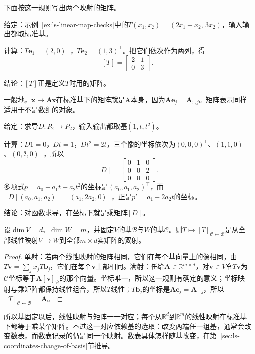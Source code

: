 下面按这一规则写出两个映射的矩阵。
\begin{example}[由基向量的像写出矩阵]
\label{ex:ls-plane-operator-matrix}
给定：示例~\ref{ex:ls-linear-map-checks}中的$T(x_1,x_2)=(2x_1+x_2,\ 3x_2)$，输入输出都取标准基。

计算：$T\bm e_1=(2,0)^{\top}$，$T\bm e_2=(1,3)^{\top}$。把它们依次作为两列，得
\[
 [T]=\begin{bmatrix}2&1\\0&3\end{bmatrix}.
\]

结论：$[T]$正是定义$T$时用的矩阵。
\end{example}
一般地，$\bm x\mapsto\bm A\bm x$在标准基下的矩阵就是$\bm A$本身，因为$\bm A\bm e_j=\bm A_{:,j}$。矩阵表示同样适用于不是数组的对象。
\begin{example}[求导的矩阵表示]
\label{ex:ls-derivative-matrix}
给定：求导$D:P_2\to P_2$，输入输出都取基$(1,t,t^2)$。

计算：$D1=0$，$Dt=1$，$Dt^2=2t$，三个像的坐标依次为$(0,0,0)^\top$、$(1,0,0)^\top$、$(0,2,0)^\top$，所以
\[
 [D]=\begin{bmatrix}0&1&0\\0&0&2\\0&0&0\end{bmatrix}.
\]
多项式$p=a_0+a_1t+a_2t^2$的坐标是$(a_0,a_1,a_2)^\top$，而$[D](a_0,a_1,a_2)^\top=(a_1,2a_2,0)^\top$，正是$p'=a_1+2a_2t$的坐标。

结论：对函数求导，在坐标下就是乘矩阵$[D]$。
\end{example}

\begin{theorem}[线性映射与矩阵的对应]
\label{thm:ls-map-matrix-correspondence}
设$\dim V=d$、$\dim W=m$，并固定$V$的基$\mathcal B$与$W$的基$\mathcal C$。则$T\mapsto[T]_{\mathcal C\leftarrow\mathcal B}$是从全部线性映射$V\to W$到全部$m\times d$实矩阵的双射。
\end{theorem}
\begin{proof}
单射：若两个线性映射的矩阵相同，它们在每个基向量上的像相同，由$T\bm v=\sum_jx_jT\bm b_j$，它们在每个$\bm v$上都相同。满射：任给$\bm A\in\mathbb R^{m\times d}$，对$\bm v\in V$令$T\bm v$为$\mathcal C$坐标等于$\bm A[\bm v]_{\mathcal B}$的那个向量。坐标唯一，所以这一规则有确定的意义；坐标映射与乘矩阵都保持线性组合，所以$T$线性；$T\bm b_j$的坐标是$\bm A\bm e_j=\bm A_{:,j}$，所以$[T]_{\mathcal C\leftarrow\mathcal B}=\bm A$。
\end{proof}
所以基固定以后，线性映射与矩阵一一对应；每个从$\mathbb R^d$到$\mathbb R^m$的线性映射在标准基下都等于乘某个矩阵。不过这一对应依赖基的选取：改变两端任一组基，通常会改变数表，而数表记录的仍是同一个映射。数表具体怎样随基改变，在第~\ref{sec:ls-coordinates-change-of-basis}节推导。

